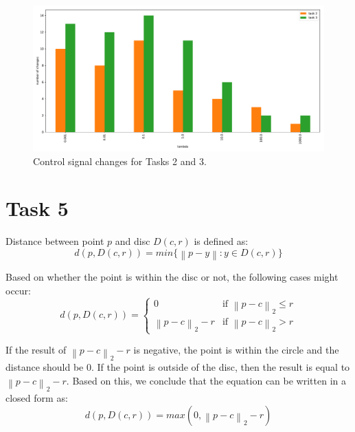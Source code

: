 \begin{figure}[!htb]
    \centering
    \includegraphics[width=\linewidth]{part1/notebooks/task_2_3_signal_changes.pdf}
    \caption{Control signal changes for Tasks 2 and 3.}
    \label{fig:task4:changes}
\end{figure}

\section{Task 5}

Distance between point $p$ and disc $D\left(c, r\right)$ is defined as:
\begin{equation}
    d\left(p,D\left(c,r\right)\right) = \textit{min}\{\left\|p-y\right\|: y \in D\left(c, r\right)\}
\end{equation}

Based on whether the point is within the disc or not, the following cases might occur:
\begin{equation}
	d\left( p,D(c,r) \right) = 
	\begin{cases} 
		0                           & \text{if } \left\|p - c\right\|_2 \leq r\\ 
		\left\|p - c\right\|_2 - r 	& \text{if } \left\|p - c\right\|_2 > r
	\end{cases}
\end{equation}

If the result of $\left\|p - c\right\|_2 - r$ is negative, the point is within the circle and the distance should be 0. If the point is outside of the disc, then the result is equal to $\left\|p - c\right\|_2 - r$. Based on this, we conclude that the equation can be written in a closed form as:
\begin{equation}
	d\left(p,D\left(c,r\right)\right) = \textit{max}\left(0, \left\|p - c\right\|_2 - r \right)
\end{equation}

